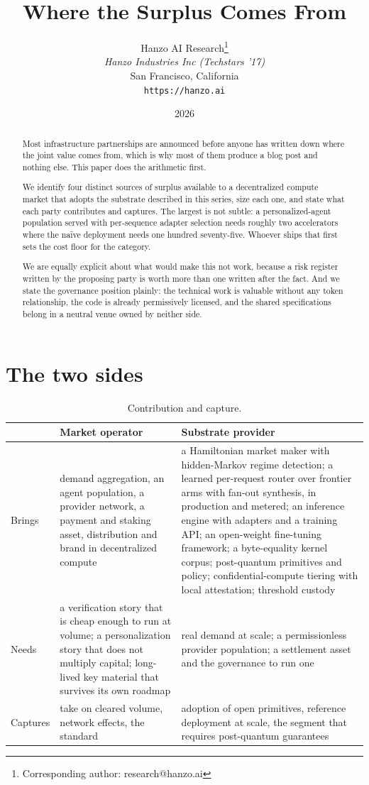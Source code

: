 \documentclass[11pt,a4paper]{article}
\title{Where the Surplus Comes From}
\author{
Hanzo AI Research\thanks{Corresponding author: research@hanzo.ai} \\
\textit{Hanzo Industries Inc (Techstars '17)} \\
San Francisco, California \\
\texttt{https://hanzo.ai}
}
\date{2026}
\begin{document}
\hanzocoverpage

\begin{abstract}
Most infrastructure partnerships are announced before anyone has written down
where the joint value comes from, which is why most of them produce a blog post
and nothing else. This paper does the arithmetic first.

We identify four distinct sources of surplus available to a decentralized
compute market that adopts the substrate described in this series, size each one,
and state what each party contributes and captures. The largest is not subtle: a
personalized-agent population served with per-sequence adapter selection needs
roughly two accelerators where the na\"ive deployment needs one hundred
seventy-five. Whoever ships that first sets the cost floor for the category.

We are equally explicit about what would make this not work, because a risk
register written by the proposing party is worth more than one written after the
fact. And we state the governance position plainly: the technical work is
valuable without any token relationship, the code is already permissively
licensed, and the shared specifications belong in a neutral venue owned by
neither side.
\end{abstract}

\tableofcontents
\newpage

\section{The two sides}

\begin{table}[h]
\centering
\begin{tabularx}{\textwidth}{lXX}
\toprule
 & Market operator & Substrate provider \\
\midrule
Brings & demand aggregation, an agent population, a provider network, a payment
and staking asset, distribution and brand in decentralized compute
 & a Hamiltonian market maker with hidden-Markov regime detection; a learned
per-request router over frontier arms with fan-out synthesis, in production and
metered; an inference engine with adapters and a training API; an open-weight
fine-tuning framework; a byte-equality kernel corpus; post-quantum primitives and
policy; confidential-compute tiering with local attestation; threshold custody \\[4pt]
Needs & a verification story that is cheap enough to run at volume; a
personalization story that does not multiply capital; long-lived key material
that survives its own roadmap
 & real demand at scale; a permissionless provider population; a settlement asset
and the governance to run one \\[4pt]
Captures & take on cleared volume, network effects, the standard
 & adoption of open primitives, reference deployment at scale, the segment that
requires post-quantum guarantees \\
\bottomrule
\end{tabularx}
\caption{Contribution and capture.}
\end{table}
\end{document}
